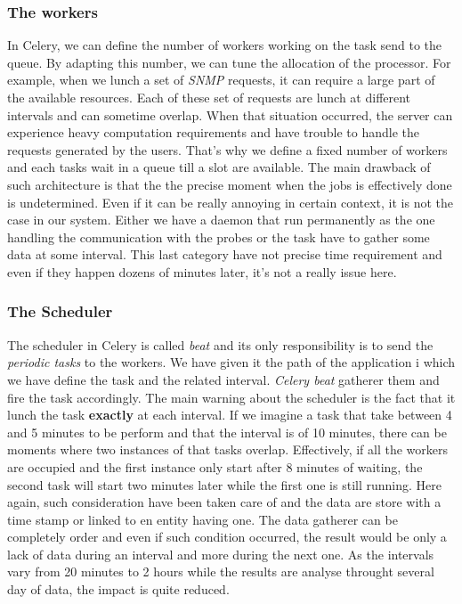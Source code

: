 \subsubsection*{The workers}
In Celery, we can define the number of workers working on the task send to the queue. By adapting this number, we can tune the allocation of the processor. For example, when we lunch a set of \emph{SNMP} requests, it can require a large part of the available resources. Each of these set of requests are lunch at different intervals and can sometime overlap. When that situation occurred, the server can experience heavy computation requirements and have trouble to handle the requests generated by the users. That's why we define a fixed number of workers and each tasks wait in a queue till a slot are available. The main drawback of such architecture is that the the precise moment when the jobs is effectively done is undetermined. Even if it can be really annoying in certain context, it is not the case in our system. Either we have a daemon that run permanently as the one handling the communication with the probes or the task have to gather some data at some interval. This last category have not precise time requirement and even if they happen dozens of minutes later, it's not a really issue here.

\subsubsection*{The Scheduler}
The scheduler in Celery is called \emph{beat} and its only responsibility is to send the \emph{periodic tasks} to the workers. We have given it the path of the application i which we have define the task and the related interval. \emph{Celery beat} gatherer them and fire the task accordingly. The main warning about the scheduler is the fact that it lunch the task \textbf{exactly} at each interval. If we imagine a task that take between 4 and 5 minutes to be perform and that the interval is of 10 minutes, there can be moments where two instances of that tasks overlap. Effectively, if all the workers are occupied and the first instance only start after 8 minutes of waiting, the second task will start two minutes later while the first one is still running. Here again, such consideration have been taken care of and the data are store with a time stamp or linked to en entity having one. The data gatherer can be completely order and even if such condition occurred, the result would be only a lack of data during an interval and more during the next one. As the intervals vary from 20 minutes to 2 hours while the results are analyse throught several day of data, the impact is quite reduced. 

